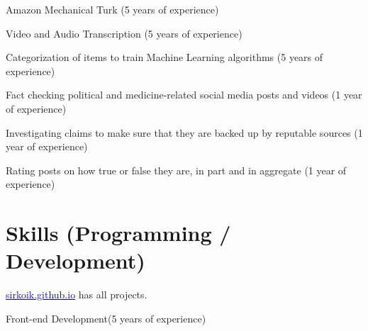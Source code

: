 \documentclass[]{deedy-resume-openfont}
\begin{document}
\descript{}
\begin{tightemize}
\item Amazon Mechanical Turk (5 years of experience)
\item Video and Audio Transcription (5 years of experience)
\item Categorization of items to train Machine Learning algorithms (5 years of experience)
\end{tightemize}
\sectionsep

\descript{}
\begin{tightemize}
\item Fact checking political and medicine-related social media posts and videos (1 year of experience)
\item Investigating claims to make sure that they are backed up by reputable sources (1 year of experience)
\item Rating posts on how true or false they are, in part and in aggregate (1 year of experience)
\end{tightemize}
\sectionsep

\newpage

\section{Skills (Programming / Development)}
\descript{}
\begin{tightemize}
\item \href{https://sirkoik.github.io#projects}{\underline{\textcolor{blue}{sirkoik.github.io}}} has all projects.
\end{tightemize}
\sectionsep

\descript{}
\begin{tightemize}
\item Front-end Development\footnotemark[\value{footnote}] (5 years of experience)
\end{tightemize}
\sectionsep
\end{document}
